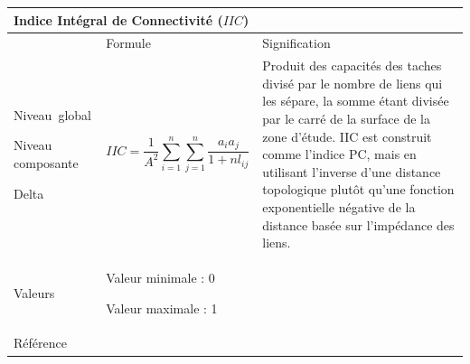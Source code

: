 \documentclass{article}
\begin{document}
\begin{table}[H]
\begin{tabular}{|m{3.24cm}|m{4.4810004cm}m{7.924cm}|}

\hline
\multicolumn{3}{|m{16.044998cm}|}{Indice Intégral de Connectivité ($IIC$)}\\\hline
 &
\multicolumn{1}{m{4.4810004cm}|}{Formule} &
Signification\\\hline
Niveau~global

Niveau composante

Delta &
\multicolumn{1}{m{4.4810004cm}|}{\begin{equation*}
\mathit{IIC}=\frac{1}{{A}^{2}}\sum _{i=1}^{n}{\sum _{j=1}^{n}{{\frac{{a}_{i}{a}_{j}}{{1+\mathit{nl}}_{\mathit{ij}}}}}}
\end{equation*}
} &
Produit des capacités des taches divisé par le nombre de liens qui les sépare, la somme étant divisée par le carré de la surface de la zone d’étude. IIC est construit comme l’indice PC, mais en utilisant l’inverse d’une distance topologique plutôt qu’une fonction exponentielle négative de la distance basée sur l’impédance des liens.

\\\hline
Valeurs &
\multicolumn{2}{m{12.6050005cm}|}{Valeur minimale : 0

Valeur maximale : 1

}\\\hline
Référence &
\multicolumn{2}{m{12.6050005cm}|}{\cite{Pascual2006}}\\\hline
\end{tabular}
\end{table}
\end{document}
